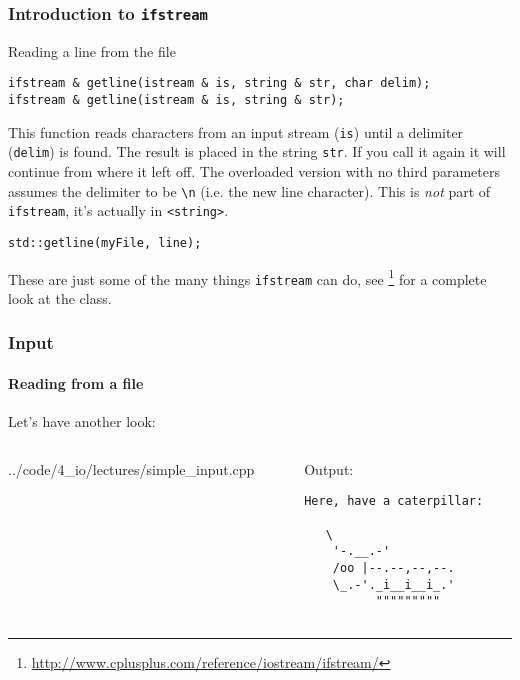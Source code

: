 \documentclass{beamer}
\begin{document}
\begin{frame}[fragile]
  \frametitle{Introduction to \texttt{ifstream}}


	\begin{block}{Reading a line from the file}
  	\begin{lstlisting}[aboveskip=0pt]
ifstream & getline(istream & is, string & str, char delim);
ifstream & getline(istream & is, string & str);
  	\end{lstlisting}
  	This function reads characters from an input stream (\texttt{is}) until a delimiter (\texttt{delim}) is found.  The result is placed in the string \texttt{str}.  If you call it again it will continue from where it left off.
  	\newline\pause
  	The overloaded version with no third parameters assumes the delimiter to be \texttt{\textbackslash{}n} (i.e. the new line character).
  	\newline\pause
  	This is \textit{not} part of \texttt{ifstream}, it's actually in \texttt{<string>}.
  	\begin{lstlisting}[belowskip=0pt]
  std::getline(myFile, line);
  	\end{lstlisting}
  \end{block}
  
  These are just some of the many things \texttt{ifstream} can do, see \footnote{\url{http://www.cplusplus.com/reference/iostream/ifstream/}} for a complete look at the class.

\end{frame}

\begin{frame}[fragile]
	\frametitle{Input}
	\framesubtitle{Reading from a file}
	
	Let's have another look:
	\begin{columns}[t]
	  \begin{column}[T]{0.5\textwidth}
    		{../code/4_io/lectures/simple_input.cpp}
		\end{column}
		\begin{column}[T]{0.5\textwidth}
		  Output:
			\begin{verbatim}Here, have a caterpillar:
						
   \
    '-.__.-'
    /oo |--.--,--,--.
    \_.-'._i__i__i_.'
          """""""""
		\end{verbatim}
		\end{column}
	\end{columns}
\end{frame}
\end{document}
